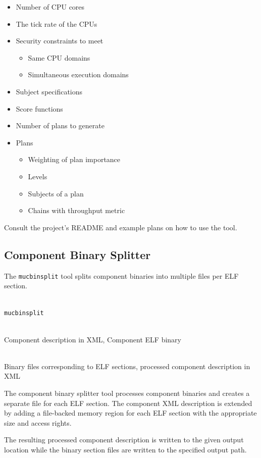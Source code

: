 \documentclass[a4paper,twoside,titlepage]{article}
\begin{document}
\begin{itemize}
	\item Number of CPU cores
	\item The tick rate of the CPUs
	\item Security constraints to meet
	\begin{itemize}
		\item Same CPU domains
		\item Simultaneous execution domains
	\end{itemize}
	\item Subject specifications
	\item Score functions
	\item Number of plans to generate
	\item Plans
	\begin{itemize}
		\item Weighting of plan importance
		\item Levels
		\item Subjects of a plan
		\item Chains with throughput metric
	\end{itemize}
\end{itemize}

Consult the project's README and example plans on how to use the tool.

\subsection{Component Binary Splitter}
\label{sec:mucbinsplit}
The \texttt{mucbinsplit} tool splits component binaries into multiple files per
ELF section.

\begin{description} \itemsep1pt \parskip0pt
	\item[Name] \hfill \\
		\texttt{mucbinsplit}
	\item[Input] \hfill \\
		Component description in XML, Component ELF binary
	\item[Output] \hfill \\
		Binary files corresponding to ELF sections, processed component
		description in XML
\end{description}

The component binary splitter tool processes component binaries and creates a
separate file for each ELF section. The component XML description is extended
by adding a file-backed memory region for each ELF section with the appropriate
size and access rights.

The resulting processed component description is written to the given output
location while the binary section files are written to the specified output
path.
\end{document}
